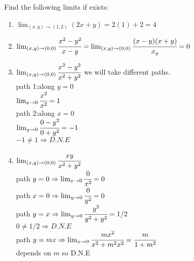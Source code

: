 \begin{example}
Find the following limits if exists:\\
\begin{enumerate}
    \item $\lim_{(x,y)\to (1,2)}(2x+y)=2(1)+2=4$
    \item $\lim_{(x,y)\to(0,0)}\cfrac{x^2-y^2}{x-y}=\lim_{(x,y)\to (0,0)}\cfrac{(x-y)(x+y)}{x_y}=0$
    \item $\lim_{(x,y)\to (0,0)}\cfrac{x^2-y^2}{x^2+y^2}$ we will take different paths.\\
    path 1:along $y=0$\\
    $\lim_{x\to 0}\cfrac{x^2}{x^2}=1$\\
    path 2:along $x=0$\\
    $\lim_{y\to 0}\cfrac{0-y^2}{0+y^2}=-1$\\
    $-1\neq 1\Rightarrow D.N.E$
    \item $\lim_{(x,y)\to (0,0)}\cfrac{xy}{x^2+y^2}$\\
    path $y=0\Rightarrow \lim_{x\to 0}\cfrac{0}{x^2}=0$\\
    path $x=0\Rightarrow \lim_{y\to0}\cfrac{0}{y^2}=0$\\
    path $y=x\Rightarrow \lim_{y\to 0}\cfrac{y^2}{y^2+y^2}=1/2$\\
    $0\neq 1/2\Rightarrow D.N.E$\\
    path $y=mx\Rightarrow\lim_{x\to 0}\cfrac{mx^2}{x^2+m^2x^2}=\cfrac{m}{1+m^2}$\\
    depends on $m$
    so D.N.E
\end{enumerate}
\end{example}